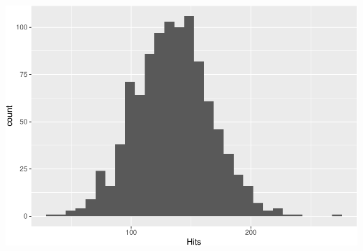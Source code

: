 \documentclass[
  11pt,
]{book}
\theoremstyle{definition}
\theoremstyle{definition}
\theoremstyle{definition}
\theoremstyle{definition}
\theoremstyle{remark}
\begin{document}
\includegraphics{series_files/figure-latex/baseball-sim-1.pdf}

  
\end{document}
